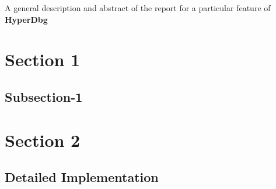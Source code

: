 \documentclass[12pt]{reporthyperdbg}
\begin{document}

\maketitle
A general description and abstract of the report for a particular feature of \textbf{HyperDbg}\cite{hyperdbg}

\vspace{0.5cm}
\makerule

\section{Section 1}


\subsection{Subsection-1}

\section{Section 2}

\subsection{Detailed Implementation}


 \printbibliography
\end{document}
